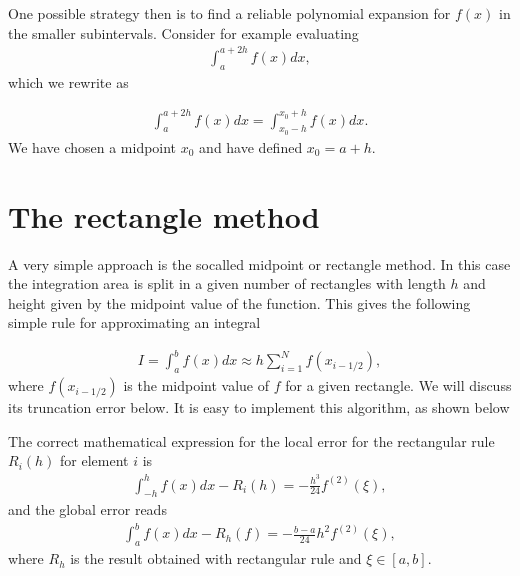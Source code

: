 \documentclass[letterpaper,10pt,english]{sphinxmanual}
\begin{document}
One possible strategy then is to find a reliable polynomial expansion for \(f(x)\) in the smaller
subintervals. Consider for example evaluating
\begin{equation*}
\begin{split}
\int_a^{a+2h}f(x)dx,
\end{split}
\end{equation*}
which we rewrite as




\begin{equation*}
\begin{split}
\begin{equation}
\int_a^{a+2h}f(x)dx=\int_{x_0-h}^{x_0+h}f(x)dx.
\label{eq:hhint} \tag{42}
\end{equation}
\end{split}
\end{equation*}
We have chosen a midpoint \(x_0\) and have defined \(x_0=a+h\).


\section{The rectangle method}
\label{\detokenize{chapter1:the-rectangle-method}}
A very simple approach is the so\sphinxhyphen{}called midpoint or rectangle method.
In this case the integration area is split in a given number of rectangles with length \(h\) and height given by the mid\sphinxhyphen{}point value of the function.  This gives the following simple rule for approximating an integral




\begin{equation*}
\begin{split}
\begin{equation}
I=\int_a^bf(x) dx \approx  h\sum_{i=1}^N f(x_{i-1/2}), 
\label{eq:rectangle} \tag{43}
\end{equation}
\end{split}
\end{equation*}
where \(f(x_{i-1/2})\) is the midpoint value of \(f\) for a given rectangle. We will discuss its truncation
error below.  It is easy to implement this algorithm,  as shown below

The correct mathematical expression for the local error for the rectangular rule \(R_i(h)\) for element \(i\) is
\begin{equation*}
\begin{split}
\int_{-h}^hf(x)dx - R_i(h)=-\frac{h^3}{24}f^{(2)}(\xi),
\end{split}
\end{equation*}
and the global error reads
\begin{equation*}
\begin{split}
\int_a^bf(x)dx -R_h(f)=-\frac{b-a}{24}h^2f^{(2)}(\xi),
\end{split}
\end{equation*}
where \(R_h\) is the result obtained with rectangular rule and \(\xi \in [a,b]\).
\end{document}

